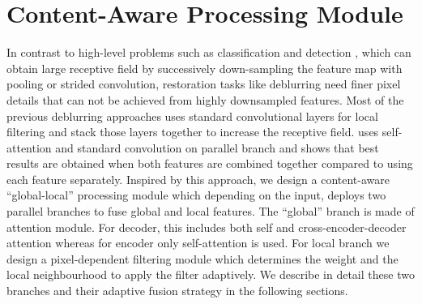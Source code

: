 \documentclass[10pt,twocolumn,letterpaper]{article}
\begin{document}
\section{Content-Aware Processing Module}
In contrast to high-level problems such as classification and detection \cite{wang2018non}, which can obtain large receptive field by successively down-sampling the feature map with pooling or strided convolution, restoration tasks like deblurring need finer pixel details that can not be achieved from highly downsampled features.
Most of the previous deblurring approaches uses standard convolutional layers for local filtering and stack those layers together to increase the receptive field. \cite{bello2019attention} uses self-attention and standard convolution on parallel branch and shows that best results are obtained when both features are combined together compared to using each feature separately. Inspired by this approach, we design a content-aware ``global-local'' processing module which depending on the input, deploys two parallel branches to fuse global and local features. The ``global'' branch is made of attention module. For decoder, this includes both self and cross-encoder-decoder attention whereas for encoder only self-attention is used. For local branch we design a pixel-dependent filtering module which determines the weight and the local neighbourhood to apply the filter adaptively. We describe in detail these two branches and their adaptive fusion strategy in the following sections.
\end{document}
